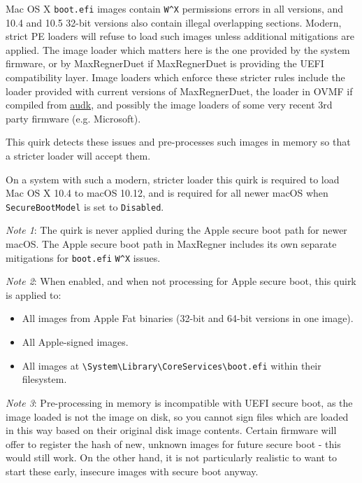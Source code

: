 \documentclass[]{article}
\providecommand{\tightlist}{%
  \setlength{\itemsep}{0pt}\setlength{\parskip}{0pt}}
\begin{document}
\begin{enumerate}
  Mac OS X \texttt{boot.efi} images contain \texttt{W\^{}X} permissions errors
  in all versions, and 10.4 and 10.5 32-bit versions also contain illegal overlapping
  sections. Modern, strict PE loaders will refuse to load such images unless additional
  mitigations are applied. The image loader which matters here is the one provided by
  the system firmware, or by MaxRegnerDuet if MaxRegnerDuet is providing
  the UEFI compatibility layer. Image loaders which enforce these stricter
  rules include the loader provided with current versions of MaxRegnerDuet,
  the loader in OVMF if compiled from \href{https://github.com/acidanthera/audk}{audk},
  and possibly the image loaders of some very recent 3rd party firmware (e.g. Microsoft).

  This quirk detects these issues and pre-processes such images in memory
  so that a stricter loader will accept them.

  On a system with such a modern, stricter loader this quirk is required to load
  Mac OS X 10.4 to macOS 10.12, and is required for all newer
  macOS when \texttt{SecureBootModel} is set to \texttt{Disabled}.

  \emph{Note 1}: The quirk is never applied during the Apple secure boot path for
  newer macOS. The Apple secure boot path in MaxRegner includes its own separate
  mitigations for \texttt{boot.efi} \texttt{W\^{}X} issues.

  \emph{Note 2}: When enabled, and when not processing for Apple secure boot, this quirk
  is applied to:
    \begin{itemize}
      \tightlist
      \item All images from Apple Fat binaries (32-bit and 64-bit versions in one image).
      \item All Apple-signed images.
      \item All images at
      \texttt{\textbackslash System\textbackslash Library\textbackslash CoreServices\textbackslash boot.efi}
      within their filesystem.
    \end{itemize}

  \emph{Note 3}: Pre-processing in memory is incompatible with UEFI secure boot, as the image
  loaded is not the image on disk, so you cannot sign files which are loaded in this way
  based on their original disk image contents.
  Certain firmware will offer to register the hash of new, unknown images for future
  secure boot - this would still work. On the other hand, it is not particularly realistic
  to want to start these early, insecure images with secure boot anyway.
  

\end{enumerate}
\end{document}

